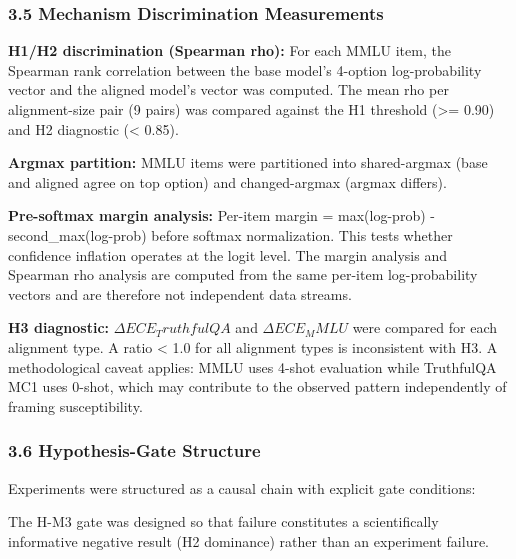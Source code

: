 \subsubsection{3.5 Mechanism Discrimination Measurements}

\textbf{H1/H2 discrimination (Spearman rho):} For each MMLU item, the Spearman rank correlation between the base model's 4-option log-probability vector and the aligned model's vector was computed. The mean rho per alignment-size pair (9 pairs) was compared against the H1 threshold (>= 0.90) and H2 diagnostic (< 0.85).

\textbf{Argmax partition:} MMLU items were partitioned into shared-argmax (base and aligned agree on top option) and changed-argmax (argmax differs).

\textbf{Pre-softmax margin analysis:} Per-item margin = max(log-prob) - second\_max(log-prob) before softmax normalization. This tests whether confidence inflation operates at the logit level. The margin analysis and Spearman rho analysis are computed from the same per-item log-probability vectors and are therefore not independent data streams.

\textbf{H3 diagnostic:} $\Delta ECE_TruthfulQA$ and $\Delta ECE_MMLU$ were compared for each alignment type. A ratio < 1.0 for all alignment types is inconsistent with H3. A methodological caveat applies: MMLU uses 4-shot evaluation while TruthfulQA MC1 uses 0-shot, which may contribute to the observed pattern independently of framing susceptibility.

\subsubsection{3.6 Hypothesis-Gate Structure}

Experiments were structured as a causal chain with explicit gate conditions:

\begin{table}[htbp]
\centering
{}
\end{table}

The H-M3 gate was designed so that failure constitutes a scientifically informative negative result (H2 dominance) rather than an experiment failure.
